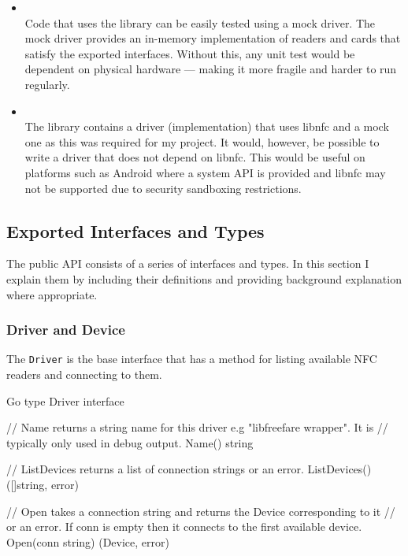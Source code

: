 \documentclass[dissertation.tex]{subfiles}
\begin{document}
  \begin{itemize}
    \item {} \\
      Code that uses the library can be easily tested using a mock driver. The mock driver provides an in-memory implementation of readers and cards that satisfy the exported interfaces. Without this, any unit test would be dependent on physical hardware --- making it more fragile and harder to run regularly.

    \item {} \\
      The library contains a driver (implementation) that uses libnfc and a mock one as this was required for my project. It would, however, be possible to write a driver that does not depend on libnfc. This would be useful on platforms such as Android where a system API is provided and libnfc may not be supported due to security sandboxing restrictions.
  \end{itemize}

  \subsection{Exported Interfaces and Types}
  The public API consists of a series of interfaces and types. In this section I explain them by including their definitions and providing background explanation where appropriate.

  \subsubsection{Driver and Device}
  The \texttt{Driver} is the base interface that has a method for listing available NFC readers and connecting to them.

  \begin{code}[numbers=none]{Go}
    type Driver interface {
    	// Name returns a string name for this driver e.g "libfreefare wrapper". It is
    	// typically only used in debug output.
    	Name() string

    	// ListDevices returns a list of connection strings or an error.
    	ListDevices() ([]string, error)

    	// Open takes a connection string and returns the Device corresponding to it
    	// or an error. If conn is empty then it connects to the first available device.
    	Open(conn string) (Device, error)
    }
  \end{code}
\end{document}
